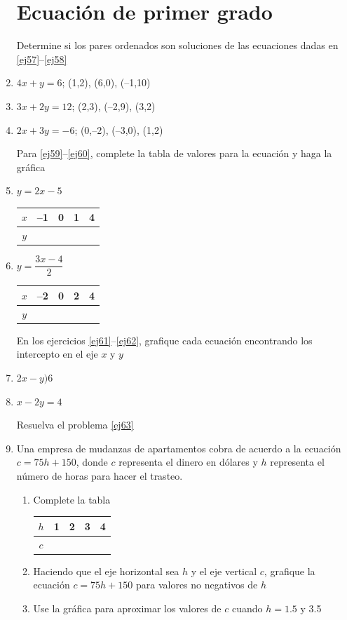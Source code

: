 \documentclass[letterpaper,twoside]{article}
\begin{document}
\begin{multicols}{2}
\begin{enumerate}
\section*{Ecuación de primer grado}
Determine si los pares ordenados son soluciones de las ecuaciones dadas en \ref{ej57}--\ref{ej58}
\item \label{ej57} $4x+y=6$; \quad (1,2), (6,0), (--1,10)
\item $3x+2y=12$; \quad (2,3), (--2,9), (3,2)
\item \label{ej58} $2x+3y=-6$; \quad (0,--2), (--3,0), (1,2)

Para \ref{ej59}--\ref{ej60}, complete la tabla de valores para la ecuación y haga la gráfica
\item \label{ej59} $y=2x-5$ 

\begin{tabular}{c|cccc}
\hline 
$x$ & --1 & 0 & 1 & 4 \\ 
\hline 
$y$ &  &  &  &  \\ 
\hline 
\end{tabular} 
\item \label{ej60} $y=\dfrac{3x-4}{2}$ 
\begin{center}
\begin{tabular}{c|cccc}
\hline 
$x$ & --2 & 0 & 2 & 4 \\ 
\hline 
$y$ &  &  &  &  \\ 
\hline 
\end{tabular} 
\end{center}

En los ejercicios \ref{ej61}--\ref{ej62}, grafique cada ecuación encontrando los intercepto en el eje $x$ y $y$
\item \label{ej61} $2x-y)6$
\item \label{ej62} $x-2y=4$

Resuelva el problema \ref{ej63}
\item \label{ej63} Una empresa de mudanzas de apartamentos cobra de acuerdo a la ecuación $c=75h+150$, donde $c$ representa el dinero en dólares y $h$ representa el número de horas para hacer el trasteo. 
\begin{enumerate}
\item Complete la tabla

\begin{center}
 \begin{tabular}{c|cccc}
\hline 
$h$ & 1 & 2 & 3 & 4 \\ 
\hline 
$c$ &  &  &  &  \\ 
\hline 
\end{tabular}
 \end{center} 
\item Haciendo que el eje horizontal sea $h$ y el eje vertical $c$, grafique la ecuación $c=75h+150$ para valores no negativos de $h$
\item Use la gráfica para aproximar los valores de $c$ cuando $h=1.5$ y 3.5
\end{enumerate}



\end{enumerate}
\end{multicols}
\end{document}
